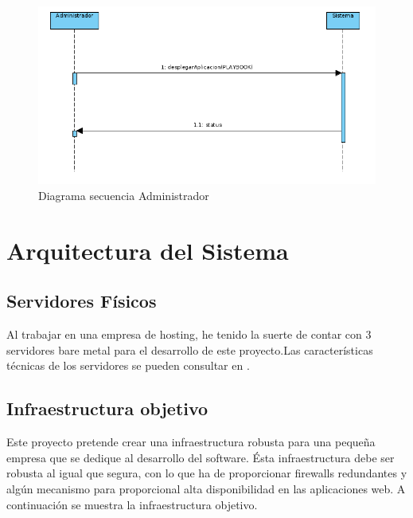 		\begin{figure}[!hbt]
			\centering
			\includegraphics[scale=0.4]{imagenes/Analisis/diagrama_secuencia_administrador_2.png}
			\caption[Diagrama secuencia Desarrollador]{Diagrama secuencia Administrador \cite{diagramasecuencia:online}}
			\label{Diagrama secuencia}
		\end{figure}
		
	
	
\section{Arquitectura del Sistema}
	\subsection{Servidores Físicos}
		\begin{paragraph}
			Al trabajar en una empresa de hosting, he tenido la suerte de contar con 3 servidores bare metal para el desarrollo de este proyecto.Las características técnicas de los servidores se pueden consultar en .
		\end{paragraph}
	\subsection{Infraestructura objetivo}
		\label{InfraestructuraObjetivo}
		\begin{paragraph}
			Este proyecto pretende crear una infraestructura robusta para una pequeña empresa que se dedique al desarrollo del software. Ésta infraestructura debe ser robusta al igual que segura, con lo que ha de proporcionar firewalls redundantes y algún mecanismo para proporcional alta disponibilidad en las aplicaciones web.  A continuación se muestra la infraestructura objetivo.
		\end{paragraph}
	
